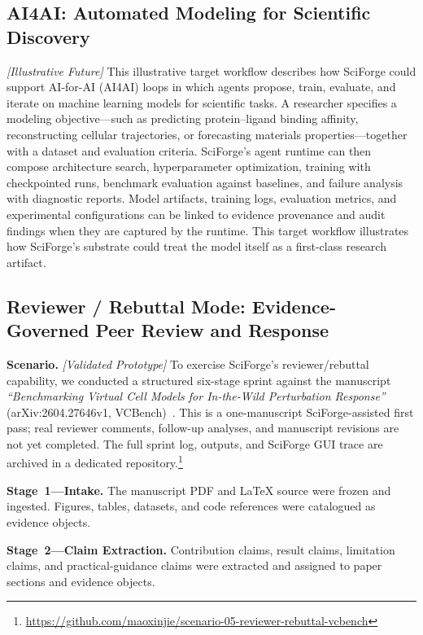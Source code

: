 \documentclass[sn-basic,Numbered,pdflatex]{sn-jnl}
\begin{document}
\subsection{AI4AI: Automated Modeling for Scientific Discovery}

\textit{[Illustrative Future]} This illustrative target workflow describes how SciForge could support AI-for-AI (AI4AI) loops in which agents propose, train, evaluate, and iterate on machine learning models for scientific tasks. A researcher specifies a modeling objective---such as predicting protein--ligand binding affinity, reconstructing cellular trajectories, or forecasting materials properties---together with a dataset and evaluation criteria. SciForge's agent runtime can then compose architecture search, hyperparameter optimization, training with checkpointed runs, benchmark evaluation against baselines, and failure analysis with diagnostic reports. Model artifacts, training logs, evaluation metrics, and experimental configurations can be linked to evidence provenance and audit findings when they are captured by the runtime. This target workflow illustrates how SciForge's substrate could treat the model itself as a first-class research artifact.

\subsection{Reviewer / Rebuttal Mode: Evidence-Governed Peer Review and Response}

\textbf{Scenario.} \textit{[Validated Prototype]} To exercise SciForge's reviewer/rebuttal capability, we conducted a structured six-stage sprint against the manuscript \textit{``Benchmarking Virtual Cell Models for In-the-Wild Perturbation Response''} (arXiv:2604.27646v1, VCBench)~\cite{vcbench2026}. This is a one-manuscript SciForge-assisted first pass; real reviewer comments, follow-up analyses, and manuscript revisions are not yet completed. The full sprint log, outputs, and SciForge GUI trace are archived in a dedicated repository.\footnote{\url{https://github.com/maoxinjie/scenario-05-reviewer-rebuttal-vcbench}}

\textbf{Stage~1---Intake.} The manuscript PDF and LaTeX source were frozen and ingested. Figures, tables, datasets, and code references were catalogued as evidence objects.

\textbf{Stage~2---Claim Extraction.} Contribution claims, result claims, limitation claims, and practical-guidance claims were extracted and assigned to paper sections and evidence objects.
\end{document}
